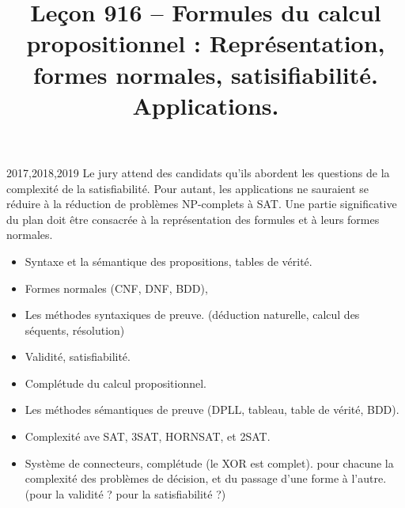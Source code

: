 \documentclass{agregfiche}
\title{Leçon 916 -- Formules du calcul propositionnel : Représentation, formes
normales, satisifiabilité. Applications.}
\begin{document}
\maketitle

\secrapports

\begin{rapport}{2017,2018,2019}
    Le jury attend des candidats qu'ils abordent les questions de la complexité de la satisfiabilité. Pour autant, les applications ne sauraient se réduire à la réduction de problèmes NP-complets à SAT. Une partie significative du plan doit être consacrée à la représentation des formules et à leurs formes normales.
\end{rapport}

\secindispensables

\begin{itemize}
    \item Syntaxe et la sémantique des propositions, tables de vérité.
    \item Formes normales (CNF, DNF, BDD),
    \item Les méthodes syntaxiques de preuve. (déduction naturelle,
      calcul des séquents, résolution)
    \item Validité, satisfiabilité.

\end{itemize}

\secasavoir

\begin{itemize}
    \item Complétude du calcul propositionnel.
    \item Les méthodes sémantiques de preuve (DPLL, tableau,
table de vérité, BDD).
	\item Complexité ave SAT, 3SAT, HORNSAT, et 2SAT.
	\item Système de connecteurs, complétude (le XOR est complet).
	pour chacune la complexité des problèmes de décision,
	et du passage d'une forme à l'autre. (pour la validité ? pour la
	satisfiabilité ?)
\end{itemize}


\secidees
\end{document}
